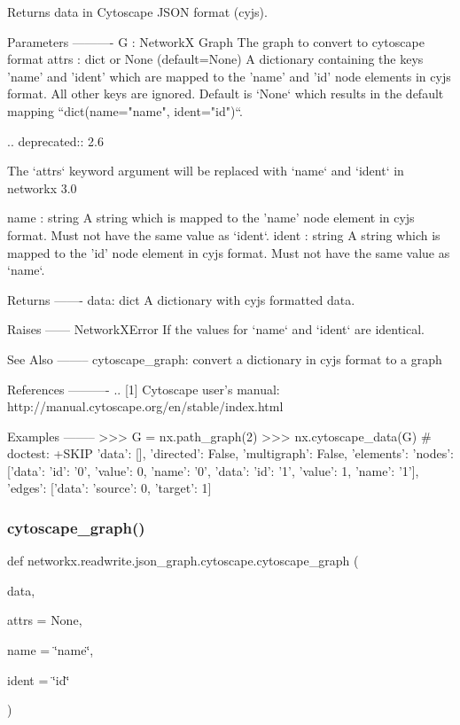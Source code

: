 \begin{DoxyVerb}Returns data in Cytoscape JSON format (cyjs).

Parameters
----------
G : NetworkX Graph
    The graph to convert to cytoscape format
attrs : dict or None (default=None)
    A dictionary containing the keys 'name' and 'ident' which are mapped to
    the 'name' and 'id' node elements in cyjs format. All other keys are
    ignored. Default is `None` which results in the default mapping
    ``dict(name="name", ident="id")``.

    .. deprecated:: 2.6

       The `attrs` keyword argument will be replaced with `name` and
       `ident` in networkx 3.0

name : string
    A string which is mapped to the 'name' node element in cyjs format.
    Must not have the same value as `ident`.
ident : string
    A string which is mapped to the 'id' node element in cyjs format.
    Must not have the same value as `name`.

Returns
-------
data: dict
    A dictionary with cyjs formatted data.

Raises
------
NetworkXError
    If the values for `name` and `ident` are identical.

See Also
--------
cytoscape_graph: convert a dictionary in cyjs format to a graph

References
----------
.. [1] Cytoscape user's manual:
   http://manual.cytoscape.org/en/stable/index.html

Examples
--------
>>> G = nx.path_graph(2)
>>> nx.cytoscape_data(G)  # doctest: +SKIP
{'data': [],
 'directed': False,
 'multigraph': False,
 'elements': {'nodes': [{'data': {'id': '0', 'value': 0, 'name': '0'}},
   {'data': {'id': '1', 'value': 1, 'name': '1'}}],
  'edges': [{'data': {'source': 0, 'target': 1}}]}}
\end{DoxyVerb}
 \mbox{\label{namespacenetworkx_1_1readwrite_1_1json__graph_1_1cytoscape_a53e0da9b4289a61f98c229aa3fa6deb6}} 
\subsubsection{\texorpdfstring{cytoscape\+\_\+graph()}{cytoscape\_graph()}}
{\footnotesize\ttfamily def networkx.\+readwrite.\+json\+\_\+graph.\+cytoscape.\+cytoscape\+\_\+graph (\begin{DoxyParamCaption}\item[{}]{data,  }\item[{}]{attrs = {\ttfamily None},  }\item[{}]{name = {\ttfamily \char`\"{}name\char`\"{}},  }\item[{}]{ident = {\ttfamily \char`\"{}id\char`\"{}} }\end{DoxyParamCaption})}

